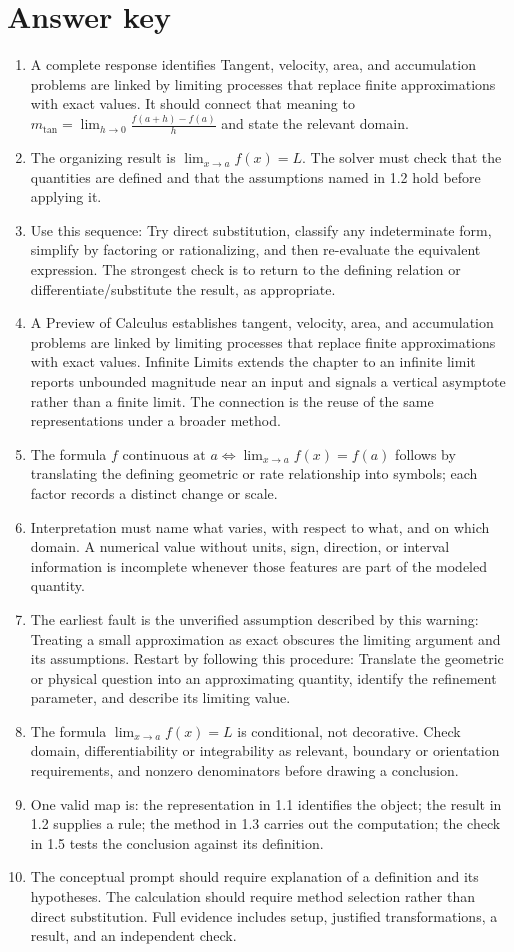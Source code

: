 \documentclass[11pt]{article}
\begin{document}
\section{Answer key}
\small
\begin{enumerate}
\item A complete response identifies Tangent, velocity, area, and accumulation problems are linked by limiting processes that replace finite approximations with exact values. It should connect that meaning to \(m_{\mathrm{tan}}=\lim_{h\to0}\frac{f(a+h)-f(a)}{h}\) and state the relevant domain.
\item The organizing result is \(\lim_{x\to a}f(x)=L\). The solver must check that the quantities are defined and that the assumptions named in 1.2 hold before applying it.
\item Use this sequence: Try direct substitution, classify any indeterminate form, simplify by factoring or rationalizing, and then re-evaluate the equivalent expression. The strongest check is to return to the defining relation or differentiate/substitute the result, as appropriate.
\item A Preview of Calculus establishes tangent, velocity, area, and accumulation problems are linked by limiting processes that replace finite approximations with exact values. Infinite Limits extends the chapter to an infinite limit reports unbounded magnitude near an input and signals a vertical asymptote rather than a finite limit. The connection is the reuse of the same representations under a broader method.
\item The formula \(f\text{ continuous at }a\iff \lim_{x\to a}f(x)=f(a)\) follows by translating the defining geometric or rate relationship into symbols; each factor records a distinct change or scale.
\item Interpretation must name what varies, with respect to what, and on which domain. A numerical value without units, sign, direction, or interval information is incomplete whenever those features are part of the modeled quantity.
\item The earliest fault is the unverified assumption described by this warning: Treating a small approximation as exact obscures the limiting argument and its assumptions. Restart by following this procedure: Translate the geometric or physical question into an approximating quantity, identify the refinement parameter, and describe its limiting value.
\item The formula \(\lim_{x\to a}f(x)=L\) is conditional, not decorative. Check domain, differentiability or integrability as relevant, boundary or orientation requirements, and nonzero denominators before drawing a conclusion.
\item One valid map is: the representation in 1.1 identifies the object; the result in 1.2 supplies a rule; the method in 1.3 carries out the computation; the check in 1.5 tests the conclusion against its definition.
\item The conceptual prompt should require explanation of a definition and its hypotheses. The calculation should require method selection rather than direct substitution. Full evidence includes setup, justified transformations, a result, and an independent check.
\end{enumerate}
\end{document}
